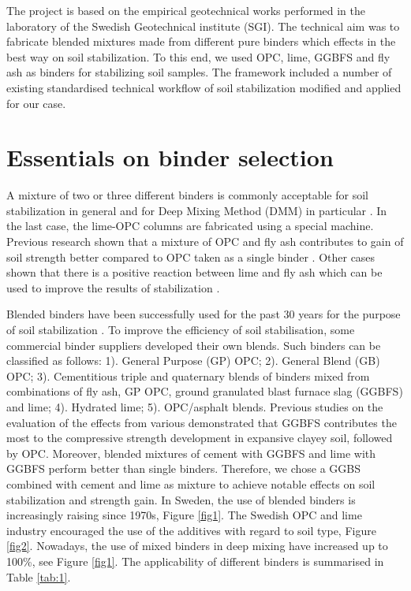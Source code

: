 \documentclass[eprint,
]{actapoly}
\begin{document}
The project is based on the empirical geotechnical works performed in the laboratory of the Swedish Geotechnical institute (SGI). The technical aim was to fabricate blended mixtures made from different pure binders which effects in the best way on soil stabilization. To this end, we used OPC, lime, GGBFS and fly ash as binders for stabilizing soil samples. The framework included a number of existing standardised technical workflow of soil stabilization modified and applied for our case.

\section{Essentials on binder selection}
A mixture of two or three different binders is commonly acceptable for soil stabilization in general and for Deep Mixing Method (DMM) in particular \cite{BergmanLarsson,Naqshabandy,Paniagua}. In the last case, the lime-OPC columns are fabricated using a special machine. Previous research shown that a mixture of OPC and fly ash contributes to gain of soil strength better compared to OPC taken as a single binder \cite{Yaxuetal2022,Vukicevicetal}. Other cases shown that there is a positive reaction between lime and fly ash which can be used to improve the results of stabilization \cite{GoswamiSingh,Raoetal2008,Knapiketal2015}. 

Blended binders have been successfully used for the past 30 years for the purpose of soil stabilization \cite{Ghazy,Consolietal2019,Lindh2001,Leeetal2019,Filho,Yietal2014,Guetal2014,Yangetal2015}. To improve the efficiency of soil stabilisation, some commercial binder suppliers developed their own blends. Such binders can be classified as follows: 1). General Purpose (GP) OPC; 2). General Blend (GB) OPC; 3). Cementitious triple and quaternary blends of binders mixed from combinations of fly ash, GP OPC, ground granulated blast furnace slag (GGBFS) and lime; 4). Hydrated lime; 5). OPC/asphalt blends. Previous studies on the evaluation of the effects from various demonstrated \cite{ma15217798} that GGBFS contributes the most to the compressive strength development in expansive clayey soil, followed by OPC. Moreover, blended mixtures of cement with GGBFS and lime with GGBFS perform better than single binders. Therefore, we chose a GGBS combined with cement and lime as mixture to achieve notable effects on soil stabilization and strength gain. In Sweden, the use of blended binders is increasingly raising since 1970s, Figure \ref{fig1}. The Swedish OPC and lime industry encouraged the use of the additives with regard to soil type, Figure \ref{fig2}. Nowadays, the use of mixed binders in deep mixing have increased up to 100\%, see Figure \ref{fig1}. The applicability of different binders is summarised in Table \ref{tab:1}. 
\end{document}

